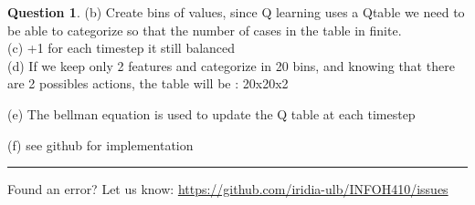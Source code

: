 \documentclass[11pt,a4paper]{article}
\theoremstyle{definition}%
\newtheorem{Q}{Question}[] %
\begin{document}
\begin{Q}
{    (b) Create bins of values, since Q learning uses a Qtable we need to be able to categorize so that
    the number of cases in the table in finite. \\

    (c) +1 for each timestep it still balanced \\

    (d) If we keep only 2 features and categorize in 20 bins, and knowing that there are 2 possibles
    actions, the table will be : 20x20x2

    (e) The bellman equation is used to update the Q table at each timestep

    (f) see github for implementation
}

\end{Q}

\noindent
\rule{\textwidth}{0.4pt}
\footnotesize{Found an error? Let us know: \url{https://github.com/iridia-ulb/INFOH410/issues}}
\end{document}
